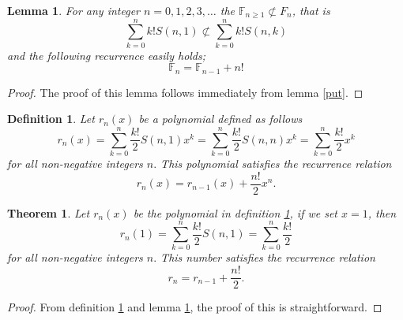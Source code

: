 \documentclass[pdflatex,sn-mathphys-num]{sn-jnl}%
\newtheorem{theorem}{Theorem}
\newtheorem{lemma}{Lemma}
\newtheorem{definition}{Definition}
\theoremstyle{thmstyleone}%
\theoremstyle{thmstyletwo}%
\theoremstyle{thmstylethree}%
\begin{document}
\begin{lemma}\label{rt}
For any integer $n=0,1,2,3,\ldots$ the $\mathbb{F}_{n\geq1}\not\subset F_n$, that is $$\sum_{k=0}^n k! S(n,1)\not\subset \sum_{k=0}^n k! S(n,k)$$ and 
the following recurrence easily holds;
$$ \mathbb{F}_{n}=\mathbb{F}_{n-1}+n!$$   
\end{lemma}
\begin{proof}
    The proof of this lemma follows immediately from lemma \ref{put}.
\end{proof}

\begin{definition}\label{Kr}
     Let $r_n(x)$  be a polynomial defined as follows
    \begin{equation*}
r_{n}(x)=\sum_{k=0}^n \frac{k!}{2} S(n,1)x^k=\sum_{k=0}^n \frac{k!}{2} S(n,n)x^k=\sum_{k=0}^n \frac{k!}{2}x^k
 \end{equation*}
 for all non-negative integers $n.$ This polynomial satisfies the recurrence relation
 $$ r_{n}(x)=r_{n-1}(x)+ \frac{n!}{2}x^n.$$  
\end{definition}

\begin{theorem}
    Let $r_n(x)$  be the polynomial in definition \ref{Kr}, if we set $x=1$, then
    \begin{equation*}
r_{n}(1)=\sum_{k=0}^n \frac{k!}{2} S(n,1)=\sum_{k=0}^n \frac{k!}{2}
 \end{equation*}
 for all non-negative integers $n.$ This number satisfies the recurrence relation
 $$ r_{n}=r_{n-1}+ \frac{n!}{2}.$$  
\end{theorem}
\begin{proof}
    From definition \ref{Kr} and lemma \ref{rt}, the proof of this is straightforward.
\end{proof}
\end{document}
